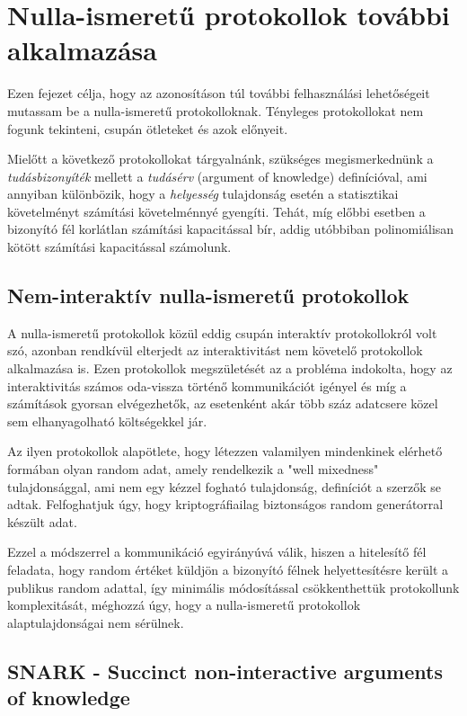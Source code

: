 \chapter{Nulla-ismeretű protokollok további alkalmazása}

Ezen fejezet célja, hogy az azonosításon túl további felhasználási lehetőségeit mutassam be a nulla-ismeretű protokolloknak. Tényleges protokollokat nem fogunk tekinteni, csupán ötleteket és azok előnyeit.

Mielőtt a következő protokollokat tárgyalnánk, szükséges megismerkednünk a \textit{tudásbizonyíték} mellett a \textit{tudásérv} (argument of knowledge) definícióval, ami annyiban különbözik, hogy a \textit{helyesség} tulajdonság esetén a statisztikai követelményt számítási követelménnyé gyengíti. Tehát, míg előbbi esetben a bizonyító fél korlátlan számítási kapacitással bír, addig utóbbiban polinomiálisan kötött számítási kapacitással számolunk.

\section{Nem-interaktív nulla-ismeretű protokollok}

A nulla-ismeretű protokollok közül eddig csupán interaktív protokollokról volt szó, azonban rendkívül elterjedt az interaktivitást nem követelő protokollok alkalmazása is. Ezen protokollok megszületését az a probléma indokolta, hogy az interaktivitás számos oda-vissza történő kommunikációt igényel és míg a számítások gyorsan elvégezhetők, az esetenként akár több száz adatcsere közel sem elhanyagolható költségekkel jár. 

Az ilyen protokollok \cite{NIZK, NIZK2} alapötlete, hogy létezzen valamilyen mindenkinek elérhető formában olyan random adat, amely rendelkezik a "well mixedness" tulajdonsággal, ami nem egy kézzel fogható tulajdonság, definíciót a szerzők se adtak. Felfoghatjuk úgy, hogy kriptográfiailag biztonságos random generátorral készült adat.

Ezzel a módszerrel a kommunikáció egyirányúvá válik, hiszen a hitelesítő fél feladata, hogy random értéket küldjön a bizonyító félnek helyettesítésre került a publikus random adattal, így minimális módosítással csökkenthettük protokollunk komplexitását, méghozzá úgy, hogy a nulla-ismeretű protokollok alaptulajdonságai nem sérülnek.

\section{SNARK - Succinct non-interactive arguments of knowledge}

